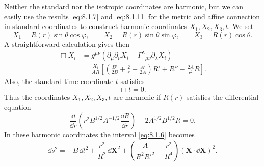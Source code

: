 Neither the standard nor the isotropic coordinates are harmonic, but we can
easily use the results \eqref{eq:8.1.7} and \eqref{eq:8.1.11} for the
metric and affine connection in standard coordinates to construct harmonic
coordinates \(X_1,X_2,X_3,t\). We set
\begin{equation}
  X_1=R(r)\sin\theta\cos\varphi,\qquad
  X_2=R(r)\sin\theta\sin\varphi,\qquad
  X_3=R(r)\cos\theta.
  \tag{8.1.14}\label{eq:8.1.14}
\end{equation}
A straightforward calculation gives then
\[
  \begin{split}
  \Box X_i
  &=
  g^{\mu\nu}
  \left(
    \partial_\mu\partial_\nu X_i
    -\Gamma^\lambda{}_{\mu\nu}\partial_\lambda X_i
  \right)
  \\
  &=
  \frac{X_i}{AR}
  \left[
    \left(\frac{B'}{2B}+\frac2r-\frac{A'}{2A}\right)R'
    +R''-\frac{2A}{r^2}R
  \right].
  \end{split}
\]
Also, the standard time coordinate \(t\) satisfies
\[
  \Box t=0.
\]
Thus the coordinates \(X_1,X_2,X_3,t\) are harmonic if \(R(r)\) satisfies
the differential equation
\begin{equation}
  \frac{\dd}{\dd r}
  \left(r^2B^{1/2}A^{-1/2}\frac{\dd R}{\dd r}\right)
  -2A^{1/2}B^{1/2}R=0.
  \tag{8.1.15}\label{eq:8.1.15}
\end{equation}
In these harmonic coordinates the interval \eqref{eq:8.1.6} becomes
\begin{equation}
  \dd s^2
  =
  -B\,\dd t^2+\frac{r^2}{R^2}\,\dd\mathbf{X}^2
  +\left(\frac{A}{R^2R'^2}-\frac{r^2}{R^4}\right)
  (\mathbf{X}\cdot \dd\mathbf{X})^2.
  \tag{8.1.16}\label{eq:8.1.16}
\end{equation}
